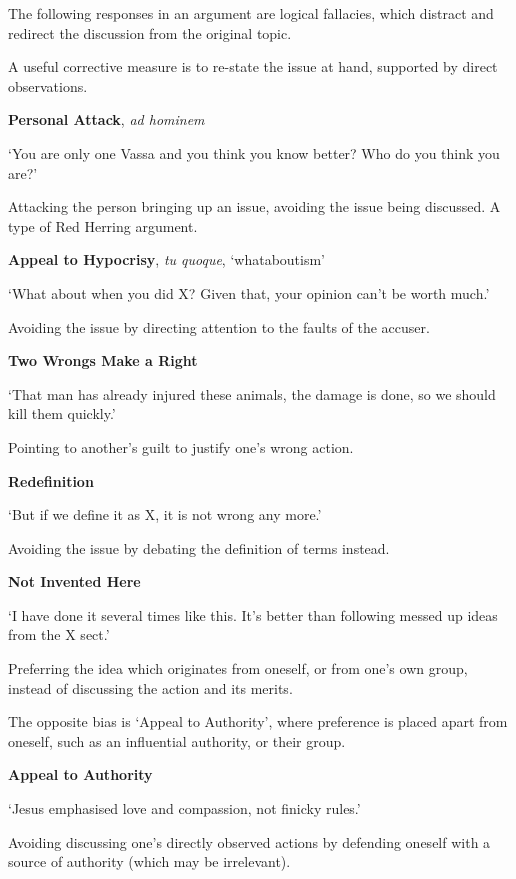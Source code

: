 \bigskip

The following responses in an argument are logical fallacies, which
distract and redirect the discussion from the original topic.

A useful corrective measure is to re-state the issue at hand, supported
by direct observations.

\textbf{Personal Attack}, \emph{ad hominem}

`You are only one Vassa and you think you know better? Who do you think
you are?'

Attacking the person bringing up an issue, avoiding the issue being
discussed. A type of Red Herring argument.

\textbf{Appeal to Hypocrisy}, \emph{tu quoque}, `whataboutism'

`What about when you did X? Given that, your opinion can't be worth
much.'

Avoiding the issue by directing attention to the faults of the accuser.

\textbf{Two Wrongs Make a Right}

`That man has already injured these animals, the damage is done, so we
should kill them quickly.'

Pointing to another's guilt to justify one's wrong action.

\textbf{Redefinition}

`But if we define it as X, it is not wrong any more.'

Avoiding the issue by debating the definition of terms instead.

\textbf{Not Invented Here}

\enlargethispage*{2\baselineskip}

`I have done it several times like this. It's better than following
messed up ideas from the X sect.'

Preferring the idea which originates from oneself, or from one's own
group, instead of discussing the action and its merits.

The opposite bias is `Appeal to Authority', where preference is placed
apart from oneself, such as an influential authority, or their group.

\clearpage

\textbf{Appeal to Authority}

`Jesus emphasised love and compassion, not finicky rules.'

Avoiding discussing one's directly observed actions by defending oneself
with a source of authority (which may be irrelevant).

